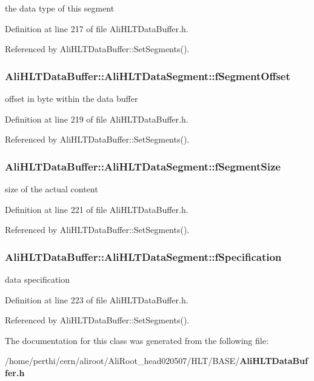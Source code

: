 the data type of this segment 

Definition at line 217 of file Ali\-HLTData\-Buffer.h.

Referenced by Ali\-HLTData\-Buffer::Set\-Segments().
\subsubsection{ {\bf Ali\-HLTData\-Buffer::Ali\-HLTData\-Segment::f\-Segment\-Offset}\hspace{0.3cm}{\tt  [private]}}\label{classAliHLTDataBuffer_1_1AliHLTDataSegment_r1}


offset in byte within the data buffer 

Definition at line 219 of file Ali\-HLTData\-Buffer.h.

Referenced by Ali\-HLTData\-Buffer::Set\-Segments().
\subsubsection{ {\bf Ali\-HLTData\-Buffer::Ali\-HLTData\-Segment::f\-Segment\-Size}\hspace{0.3cm}{\tt  [private]}}\label{classAliHLTDataBuffer_1_1AliHLTDataSegment_r2}


size of the actual content 

Definition at line 221 of file Ali\-HLTData\-Buffer.h.

Referenced by Ali\-HLTData\-Buffer::Set\-Segments().
\subsubsection{ {\bf Ali\-HLTData\-Buffer::Ali\-HLTData\-Segment::f\-Specification}\hspace{0.3cm}{\tt  [private]}}\label{classAliHLTDataBuffer_1_1AliHLTDataSegment_r3}


data specification 

Definition at line 223 of file Ali\-HLTData\-Buffer.h.

Referenced by Ali\-HLTData\-Buffer::Set\-Segments().

The documentation for this class was generated from the following file:\begin{CompactItemize}
\item 
/home/perthi/cern/aliroot/Ali\-Root\_\-head020507/HLT/BASE/{\bf Ali\-HLTData\-Buffer.h}\end{CompactItemize}
